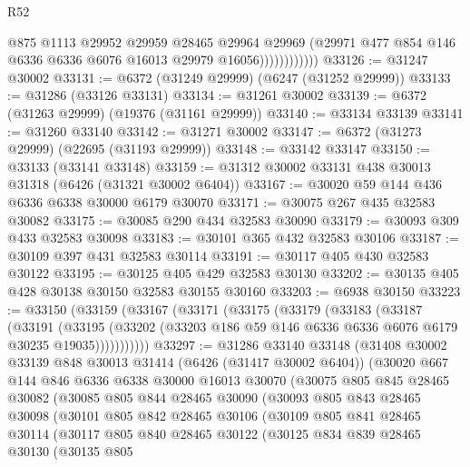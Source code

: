 \begin{lexlean}{R52}
\begin{coremodule}
                          @875
                          @1113
                          @29952
                          @29959
                          @28465
                          @29964
                          @29969
                          (@29971 @477 @854 @146 @6336 @6336 @6076 @16013 @29979 @16056))))))))))))
@33126 := @31247 @30002
@33131 := @6372 (@31249 @29999) (@6247 (@31252 @29999))
@33133 := @31286 (@33126 @33131)
@33134 := @31261 @30002
@33139 := @6372 (@31263 @29999) (@19376 (@31161 @29999))
@33140 := @33134 @33139
@33141 := @31260 @33140
@33142 := @31271 @30002
@33147 := @6372 (@31273 @29999) (@22695 (@31193 @29999))
@33148 := @33142 @33147
@33150 := @33133 (@33141 @33148)
@33159 := @31312 @30002 @33131 @438 @30013 @31318 (@6426 (@31321 @30002 @6404))
@33167 := @30020 @59 @144 @436 @6336 @6338 @30000 @6179 @30070
@33171 := @30075 @267 @435 @32583 @30082
@33175 := @30085 @290 @434 @32583 @30090
@33179 := @30093 @309 @433 @32583 @30098
@33183 := @30101 @365 @432 @32583 @30106
@33187 := @30109 @397 @431 @32583 @30114
@33191 := @30117 @405 @430 @32583 @30122
@33195 := @30125 @405 @429 @32583 @30130
@33202 := @30135 @405 @428 @30138 @30150 @32583 @30155 @30160
@33203 := @6938 @30150
@33223 := @33150
    (@33159
      (@33167
        (@33171
          (@33175
            (@33179
              (@33183
                (@33187
                  (@33191
                    (@33195
                      (@33202 (@33203 @186 @59 @146 @6336 @6336 @6076 @6179 @30235 @19035)))))))))))
@33297 := @31286
    @33140
    @33148
    (@31408
      @30002
      @33139
      @848
      @30013
      @31414
      (@6426 (@31417 @30002 @6404))
      (@30020
        @667
        @144
        @846
        @6336
        @6338
        @30000
        @16013
        @30070
        (@30075
          @805
          @845
          @28465
          @30082
          (@30085
            @805
            @844
            @28465
            @30090
            (@30093
              @805
              @843
              @28465
              @30098
              (@30101
                @805
                @842
                @28465
                @30106
                (@30109
                  @805
                  @841
                  @28465
                  @30114
                  (@30117
                    @805
                    @840
                    @28465
                    @30122
                    (@30125
                      @834
                      @839
                      @28465
                      @30130
                      (@30135
                        @805

\end{coremodule}
\end{lexlean}
